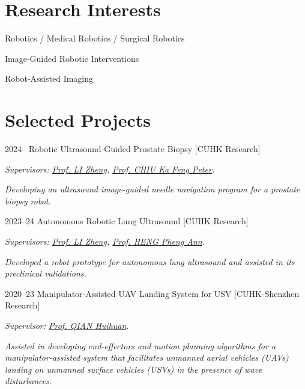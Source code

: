 \documentclass[11pt,letterpaper]{report}
\newcommand{\listitemspace}{0.25em}
\renewenvironment{itemize}
{\begin{list}{}{\setlength{\leftmargin}{0em}
			\setlength{\parskip}{0em}
			\setlength{\itemsep}{\listitemspace}
			\setlength{\parsep}{\listitemspace}}}
	{\end{list}}
\begin{document}
\section*{Research Interests}
\begin{itemize}
	\item Robotics / Medical Robotics / Surgical Robotics
	\item Image-Guided Robotic Interventions
	\item Robot-Assisted Imaging
\end{itemize}
	
\section*{Selected Projects}
\begin{tablist}
	
	\item[2024--] \tab Robotic Ultrasound-Guided Prostate Biopsy [CUHK Research]

	\textit{Supervisors: \href{https://www.surgery.cuhk.edu.hk/profile.asp?alias=zli}{Prof. LI Zheng}, \href{https://www.surgery.cuhk.edu.hk/profile.asp?alias=peterchiu}{Prof. CHIU Ka Feng Peter}.}
	
	\textit{Developing an ultrasound image-guided needle navigation program for a prostate biopsy robot.}
	
	\item[2023--24] \tab Autonomous Robotic Lung Ultrasound [CUHK Research]
	
	\textit{Supervisors: \href{https://www.surgery.cuhk.edu.hk/profile.asp?alias=zli}{Prof. LI Zheng}, \href{https://www.cse.cuhk.edu.hk/people/faculty/pheng-ann-heng/}{Prof. HENG Pheng Ann}.}
	
	\emph{Developed a robot prototype for autonomous lung ultrasound and assisted in its preclinical validations.}

	\item[2020--23] \tab Manipulator-Assisted UAV Landing System for USV [CUHK-Shenzhen Research]
	
	\textit{Supervisor: \href{https://sse.cuhk.edu.cn/en/faculty/qianhuihuan}{Prof. QIAN Huihuan}.}
	
	\emph{Assisted in developing end-effectors and motion planning algorithms for a manipulator-assisted system that facilitates unmanned aerial vehicles (UAVs) landing on unmanned surface vehicles (USVs) in the presence of wave disturbances. }	
\end{tablist}
	
\end{document}
